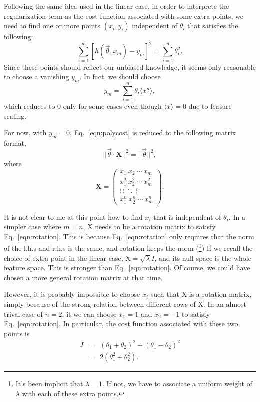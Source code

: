 Following the same idea used in the linear case, in order to interprete the regularization term as the cost function associated with some extra points, we need to find one or more points $(x_i, y_i)$ independent of $\theta_i$ that satisfies the following:
\begin{equation}
\sum_{i=1}^{m}\left[h(\vec\theta,x_m)-y_m\right]^2 = \sum_{i=1}^n\theta_i^2.
\label{eqn:polycost}
\end{equation}
Since these points should reflect our unbiased knowledge, it seems only reasonable to choose a vanishing $y_m$. In fact, we should choose
\begin{equation}
y_m = \sum_{i=1}^n\theta_i\langle x^n\rangle,
\end{equation}
which reduces to 0 only for some cases even though $\langle x\rangle=0$ due to feature scaling.

For now, with $y_m=0$, Eq.~\ref{eqn:polycost} is reduced to the following matrix format,
\begin{equation}
||\vec\theta\cdot\mathbf X||^2 = ||\vec\theta||^2,\label{eqn:rotation}
\end{equation} 
where
\begin{equation}
\mathbf X = \begin{pmatrix}
x_1\ x_2\ \cdots\ x_m\\
x_1^2\ x_2^2\ \cdots\ x_m^2\\
\vdots\ \vdots\ \ddots\ \vdots\\
x_1^n\ x_2^n\ \cdots\ x_m^n
\end{pmatrix}.
\end{equation}


It is not clear to me at this point how to find $x_i$ that is independent of $\theta_i$. In a simpler case where $m = n$, $\mathrm X$ needs to be a rotation matrix to satisfy Eq.~\ref{eqn:rotation}. This is because Eq.~\ref{eqn:rotation} only requires that the norm of the l.h.s and r.h.s is the same, and rotation keeps the norm (\footnote{It's been implicit that $\lambda=1$. If not, we have to associate a uniform weight of $\lambda$ with each of these extra points.}) If we recall the choice of extra point in the linear case, $\mathrm X=\sqrt{\lambda}I$, and its null space is the whole feature space. This is stronger than Eq.~\ref{eqn:rotation}. Of course, we could have chosen a more general rotation matrix at that time.

However, it is probably impossible to choose $x_i$ such that $\mathrm X$ is a rotation matrix, simply because of the strong relation between different rows of $\mathrm X$. In an almost trival case of $n=2$, it we can choose $x_1=1$ and $x_2=-1$ to satisfy Eq.~\ref{eqn:rotation}. In particular, the cost function associated with these two points is 
\begin{eqnarray}
J& = & \left(\theta_1 + \theta_2 \right)^2 + \left(\theta_1-\theta_2\right)^2\\
 & = & 2(\theta_1^2 + \theta_2^2).
\end{eqnarray}

